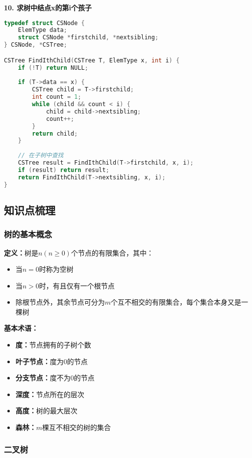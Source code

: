 \documentclass[12pt,a4paper]{amsart}
\begin{document}
\textbf{10. 求树中结点x的第i个孩子}

\begin{lstlisting}[language=C++]
typedef struct CSNode {
    ElemType data;
    struct CSNode *firstchild, *nextsibling;
} CSNode, *CSTree;

CSTree FindIthChild(CSTree T, ElemType x, int i) {
    if (!T) return NULL;
    
    if (T->data == x) {
        CSTree child = T->firstchild;
        int count = 1;
        while (child && count < i) {
            child = child->nextsibling;
            count++;
        }
        return child;
    }
    
    // 在子树中查找
    CSTree result = FindIthChild(T->firstchild, x, i);
    if (result) return result;
    return FindIthChild(T->nextsibling, x, i);
}
\end{lstlisting}

\subsection{知识点梳理}

\subsubsection{树的基本概念}

\textbf{定义：}树是$n(n \geq 0)$个节点的有限集合，其中：
\begin{itemize}
\item 当$n=0$时称为空树
\item 当$n>0$时，有且仅有一个根节点
\item 除根节点外，其余节点可分为$m$个互不相交的有限集合，每个集合本身又是一棵树
\end{itemize}

\textbf{基本术语：}
\begin{itemize}
\item \textbf{度：}节点拥有的子树个数
\item \textbf{叶子节点：}度为0的节点
\item \textbf{分支节点：}度不为0的节点
\item \textbf{深度：}节点所在的层次
\item \textbf{高度：}树的最大层次
\item \textbf{森林：}$m$棵互不相交的树的集合
\end{itemize}

\subsubsection{二叉树}
\end{document}

